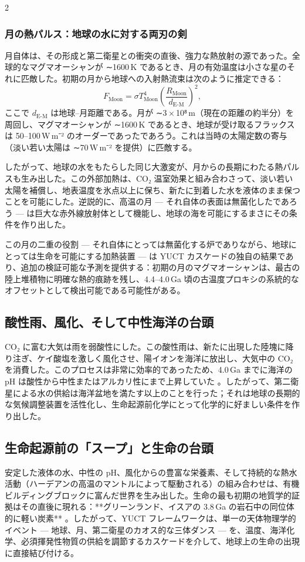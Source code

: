 \documentclass[12pt,a4paper]{article}
\begin{document}
\begin{multicols}{2}
		\subsubsection{月の熱パルス：地球の水に対する両刃の剣}
		月自体は、その形成と第二衛星との衝突の直後、強力な熱放射の源であった。全球的なマグマオーシャンが ∼1600 K であるとき、月の有効温度は小さな星のそれに匹敵した。初期の月から地球への入射熱流束は次のように推定できる：
		\[
		F_{\text{Moon}} = \sigma T_{\text{Moon}}^{4} \left( \frac{R_{\text{Moon}}}{d_{\text{E-M}}} \right)^{2},
		\]
		ここで \(d_{\text{E-M}}\) は地球–月距離である。月が ∼3 × 10⁸ m（現在の距離の約半分）を周回し、マグマオーシャンが ∼1600 K であるとき、地球が受け取るフラックスは 50–100 W m⁻² のオーダーであったであろう。これは当時の太陽定数の寄与（淡い若い太陽は ∼70 W m⁻² を提供）に匹敵する。
		
		したがって、地球の水をもたらした同じ大激変が、月からの長期にわたる熱パルスも生み出した。この外部加熱は、CO₂ 温室効果と組み合わさって、淡い若い太陽を補償し、地表温度を氷点以上に保ち、新たに到着した水を液体のまま保つことを可能にした。逆説的に、高温の月 — それ自体の表面は無菌化したであろう — は巨大な赤外線放射体として機能し、地球の海を可能にするまさにその条件を作り出した。
		
		この月の二重の役割 — それ自体にとっては無菌化する炉でありながら、地球にとっては生命を可能にする加熱装置 — は YUCT カスケードの独自の結果であり、追加の検証可能な予測を提供する：初期の月のマグマオーシャンは、最古の陸上堆積物に明確な熱的痕跡を残し、4.4–4.0 Ga 頃の古温度プロキシの系統的なオフセットとして検出可能である可能性がある。
		
		\subsection{酸性雨、風化、そして中性海洋の台頭}
		CO₂ に富む大気は雨を弱酸性にした。この酸性雨は、新たに出現した陸塊に降り注ぎ、ケイ酸塩を激しく風化させ、陽イオンを海洋に放出し、大気中の CO₂ を消費した。このプロセスは非常に効率的であったため、4.0 Ga までに海洋の pH は酸性から中性またはアルカリ性にまで上昇していた \cite{KrissansenTotton2019}。したがって、第二衛星による水の供給は海洋盆地を満たす以上のことを行った；それは地球の長期的な気候調整装置を活性化し、生命起源前化学にとって化学的に好ましい条件を作り出した。
		
		\subsection{生命起源前の「スープ」と生命の台頭}
		安定した液体の水、中性の pH、風化からの豊富な栄養素、そして持続的な熱水活動（ハーデアンの高温のマントルによって駆動される）の組み合わせは、有機ビルディングブロックに富んだ世界を生み出した。生命の最も初期の地質学的証拠はその直後に現れる：**グリーンランド、イスアの 3.8 Ga の岩石中の同位体的に軽い炭素** \cite{Arndt2012}。したがって、YUCT フレームワークは、単一の天体物理学的イベント — 地球、月、第二衛星のカオス的な三体ダンス — を、温度、海洋化学、必須揮発性物質の供給を調節するカスケードを介して、地球上の生命の出現に直接結び付ける。
		

\end{multicols}
\end{document}
